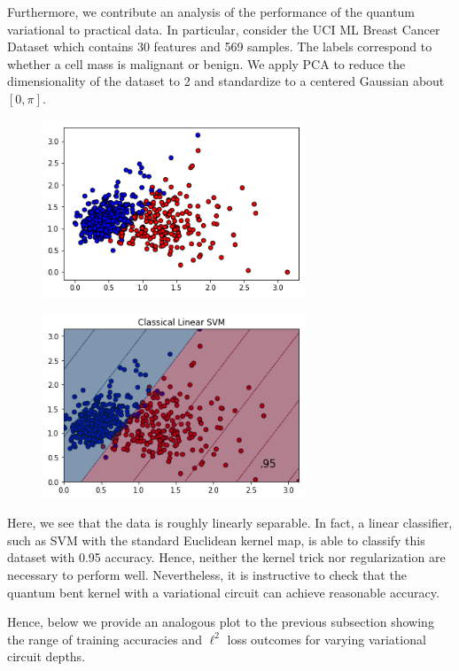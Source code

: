 \documentclass[main.tex]{subfiles}
\begin{document}
Furthermore, we contribute an analysis of the performance of the quantum variational to practical data. In particular, consider the UCI ML Breast Cancer Dataset which contains 30 features and 569 samples. The labels correspond to whether a cell mass is malignant or benign. We apply PCA to reduce the dimensionality of the dataset to 2 and standardize to a centered Gaussian about $[0, \pi]$.

\begin{figure}[H]
\centering
\includegraphics[width=0.7\textwidth]{images/breast_cancer_data}	
\end{figure}

\begin{figure}[H]
\centering
\includegraphics[width=0.7\textwidth]{images/breast_cancer_linear_svm}	
\end{figure}

Here, we see that the data is roughly linearly separable. In fact, a linear classifier, such as SVM with the standard Euclidean kernel map, is able to classify this dataset with 0.95 accuracy. Hence, neither the kernel trick nor regularization are necessary to perform well. Nevertheless, it is instructive to check that the quantum bent kernel with a variational circuit can achieve reasonable accuracy.

Hence, below we provide an analogous plot to the previous subsection showing the range of training accuracies and $\ell^2$ loss outcomes for varying variational circuit depths.
\end{document}
